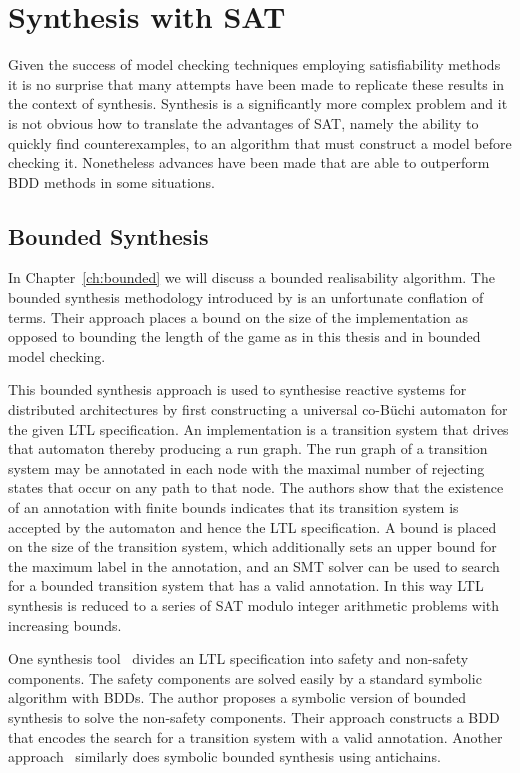 \section{Synthesis with SAT}

Given the success of model checking techniques employing satisfiability methods it is no surprise that many attempts have been made to replicate these results in the context of synthesis. Synthesis is a significantly more complex problem and it is not obvious how to translate the advantages of SAT, namely the ability to quickly find counterexamples, to an algorithm that must construct a model before checking it. Nonetheless advances have been made that are able to outperform BDD methods in some situations.

\subsection{Bounded Synthesis}

In Chapter~\ref{ch:bounded} we will discuss a bounded realisability algorithm. The bounded synthesis methodology introduced by \cite{Finkbeiner13} is an unfortunate conflation of terms. Their approach places a bound on the size of the implementation as opposed to bounding the length of the game as in this thesis and in bounded model checking. 

This bounded synthesis approach is used to synthesise reactive systems for distributed architectures by first constructing a universal co-B\"uchi automaton for the given LTL specification. An implementation is a transition system that drives that automaton thereby producing a run graph. The run graph of a transition system may be annotated in each node with the maximal number of rejecting states that occur on any path to that node. The authors show that the existence of an annotation with finite bounds indicates that its transition system is accepted by the automaton and hence the LTL specification. A bound is placed on the size of the transition system, which additionally sets an upper bound for the maximum label in the annotation, and an SMT solver can be used to search for a bounded transition system that has a valid annotation. In this way LTL synthesis is reduced to a series of SAT modulo integer arithmetic problems with increasing bounds.

One synthesis tool~\cite{Ehlers12} divides an LTL specification into safety and non-safety components. The safety components are solved easily by a standard symbolic algorithm with BDDs. The author proposes a symbolic version of bounded synthesis to solve the non-safety components. Their approach constructs a BDD that encodes the search for a transition system with a valid annotation. Another approach~\cite{Filiot11} similarly does symbolic bounded synthesis using antichains.

